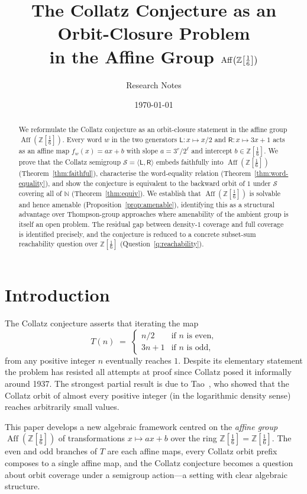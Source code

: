 \documentclass[12pt, a4paper]{amsart}
\title[Collatz as Orbit Closure in $\Aff(\Zs)$]{%
  The Collatz Conjecture as an Orbit-Closure Problem\\
  in the Affine Group $\Aff\!\left(\Z\!\left[\tfrac{1}{6}\right]\right)$
}
\author{Research Notes}
\date{\today}
\theoremstyle{plain}
\theoremstyle{definition}
\theoremstyle{remark}
\newcommand{\N}{\mathbb{N}}
\newcommand{\Z}{\mathbb{Z}}
\newcommand{\Zs}{\Z[\tfrac{1}{6}]}
\newcommand{\Aff}{\operatorname{Aff}}
\newcommand{\wL}{\mathsf{L}}
\newcommand{\wR}{\mathsf{R}}
\begin{document}
\begin{abstract}
We reformulate the Collatz conjecture as an orbit-closure statement in
the affine group $\Aff(\Zs)$.  Every word $w$ in the two generators
$\wL\colon x\mapsto x/2$ and $\wR\colon x\mapsto 3x+1$ acts as an
affine map $f_w(x)=ax+b$ with slope $a=3^r/2^\ell$ and intercept
$b\in\Zs$.  We prove that the Collatz semigroup
$\mathcal{S}=\langle\wL,\wR\rangle$ embeds faithfully into $\Aff(\Zs)$
(Theorem~\ref{thm:faithful}), characterise the word-equality relation
(Theorem~\ref{thm:word-equality}), and show the conjecture is
equivalent to the backward orbit of $1$ under $\mathcal{S}$ covering
all of $\N$ (Theorem~\ref{thm:equiv}).  We establish that $\Aff(\Zs)$
is solvable and hence amenable (Proposition~\ref{prop:amenable}),
identifying this as a structural advantage over Thompson-group
approaches where amenability of the ambient group is itself an open
problem.  The residual gap between density-$1$ coverage and full
coverage is identified precisely, and the conjecture is reduced to a
concrete subset-sum reachability question over $\Zs$
(Question~\ref{q:reachability}).
\end{abstract}

\maketitle
\tableofcontents

\section{Introduction}

The Collatz conjecture asserts that iterating the map
\[
  T(n) \;=\; \begin{cases}
    n/2   & \text{if } n \text{ is even,} \\
    3n+1  & \text{if } n \text{ is odd,}
  \end{cases}
\]
from any positive integer $n$ eventually reaches $1$.
Despite its elementary statement the problem has resisted all attempts
at proof since Collatz posed it informally around 1937.  The strongest
partial result is due to Tao~\cite{Tao2019}, who showed that the
Collatz orbit of almost every positive integer (in the logarithmic
density sense) reaches arbitrarily small values.

This paper develops a new algebraic framework centred on the
\emph{affine group} $\Aff(\Zs)$ of transformations
$x\mapsto ax+b$ over the ring $\Zs=\Z[\frac{1}{6}]$.  The even and
odd branches of $T$ are each affine maps, every Collatz orbit prefix
composes to a single affine map, and the Collatz conjecture becomes a
question about orbit coverage under a semigroup action---a setting with
clear algebraic structure.
\end{document}
